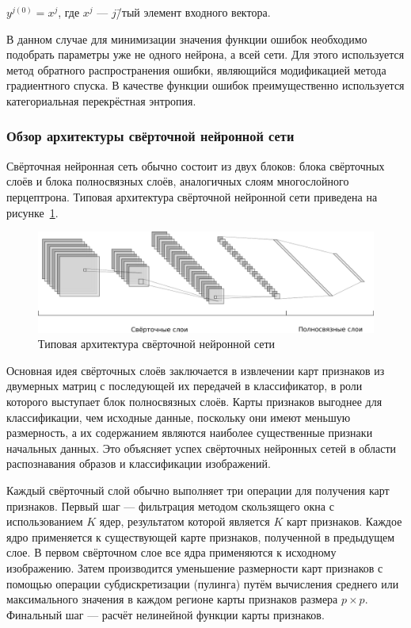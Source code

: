 $ y^{j(0)} = x^j $, где $ x^j $ --- $ j $\=/тый элемент входного вектора.

В данном случае для минимизации значения функции ошибок необходимо подобрать параметры уже не одного нейрона, а всей сети. Для этого используется метод обратного распространения ошибки, являющийся модификацией метода градиентного спуска. В качестве функции ошибок преимущественно используется категориальная перекрёстная энтропия.

\subsubsection{Обзор архитектуры свёрточной нейронной сети}

Свёрточная нейронная сеть обычно состоит из двух блоков: блока свёрточных слоёв и блока полносвязных слоёв, аналогичных слоям многослойного перцептрона. Типовая архитектура свёрточной нейронной сети приведена на рисунке~\ref{fig:CNNArchitectureExample}.

\begin{figure}[h]
\centering
\includegraphics[width=1\textwidth]{include/graphics/cnn_architecture_example}
\caption{Типовая архитектура свёрточной нейронной сети}
\label{fig:CNNArchitectureExample}
\end{figure}

Основная идея свёрточных слоёв заключается в извлечении карт признаков из двумерных матриц с последующей их передачей в классификатор, в роли которого выступает блок полносвязных слоёв. Карты признаков выгоднее для классификации, чем исходные данные, поскольку они имеют меньшую размерность, а их содержанием являются наиболее существенные признаки начальных данных. Это объясняет успех свёрточных нейронных сетей в области распознавания образов и классификации изображений.

Каждый свёрточный слой обычно выполняет три операции для получения карт признаков. Первый шаг --- фильтрация методом скользящего окна с использованием $ K $ ядер, результатом которой является $ K $ карт признаков. Каждое ядро применяется к существующей карте признаков, полученной в предыдущем слое. В первом свёрточном слое все ядра применяются к исходному изображению. Затем производится уменьшение размерности карт признаков с помощью операции субдискретизации (пулинга) путём вычисления среднего или максимального значения в каждом регионе карты признаков размера $ p \times p $. Финальный шаг --- расчёт нелинейной функции карты признаков.


